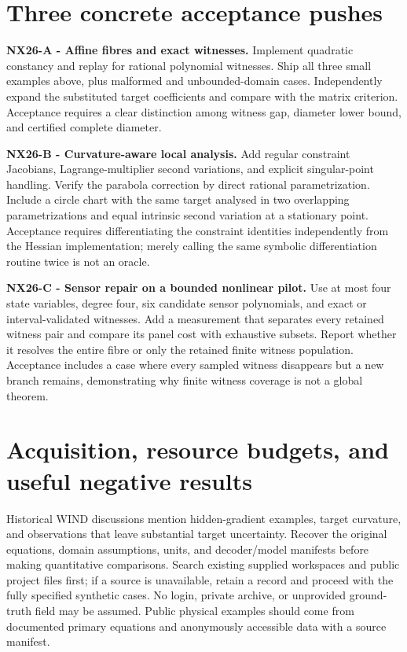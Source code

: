 \documentclass[
  11pt,
  a4paper,
]{report}
\let\nxtexttt\texttt
\renewcommand{\texttt}[1]{\nxtexttt{\seqsplit{#1}}}
\begin{document}
\hypertarget{three-concrete-acceptance-pushes-1}{%
\section{Three concrete acceptance
pushes}\label{three-concrete-acceptance-pushes-1}}

\textbf{NX26-A - Affine fibres and exact witnesses.} Implement quadratic
constancy and replay for rational polynomial witnesses. Ship all three
small examples above, plus malformed and unbounded-domain cases.
Independently expand the substituted target coefficients and compare
with the matrix criterion. Acceptance requires a clear distinction among
witness gap, diameter lower bound, and certified complete diameter.

\textbf{NX26-B - Curvature-aware local analysis.} Add regular constraint
Jacobians, Lagrange-multiplier second variations, and explicit
singular-point handling. Verify the parabola correction by direct
rational parametrization. Include a circle chart with the same target
analysed in two overlapping parametrizations and equal intrinsic second
variation at a stationary point. Acceptance requires differentiating the
constraint identities independently from the Hessian implementation;
merely calling the same symbolic differentiation routine twice is not an
oracle.

\textbf{NX26-C - Sensor repair on a bounded nonlinear pilot.} Use at
most four state variables, degree four, six candidate sensor
polynomials, and exact or interval-validated witnesses. Add a
measurement that separates every retained witness pair and compare its
panel cost with exhaustive subsets. Report whether it resolves the
entire fibre or only the retained finite witness population. Acceptance
includes a case where every sampled witness disappears but a new branch
remains, demonstrating why finite witness coverage is not a global
theorem.

\hypertarget{acquisition-resource-budgets-and-useful-negative-results}{%
\section{Acquisition, resource budgets, and useful negative
results}\label{acquisition-resource-budgets-and-useful-negative-results}}

Historical WIND discussions mention hidden-gradient examples, target
curvature, and observations that leave substantial target uncertainty.
Recover the original equations, domain assumptions, units, and
decoder/model manifests before making quantitative comparisons. Search
existing supplied workspaces and public project files first; if a source
is unavailable, retain a \texttt{source\_missing} record and proceed
with the fully specified synthetic cases. No login, private archive, or
unprovided ground-truth field may be assumed. Public physical examples
should come from documented primary equations and anonymously accessible
data with a source manifest.
\end{document}
